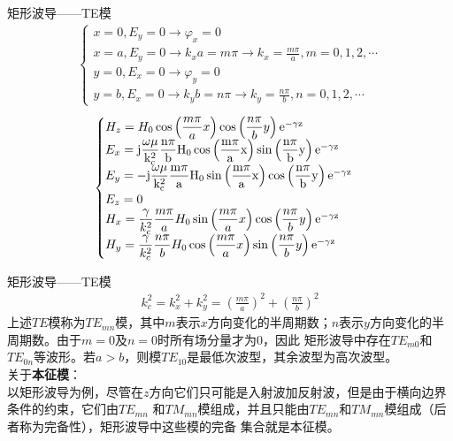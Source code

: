 \begin{frame}{矩形波导——TE模}
    \begin{align*}
        \begin{cases}
            x=0,E_y=0 \rightarrow \varphi_x=0                                              \\
            x=a,E_y=0 \rightarrow k_x a=m\pi \rightarrow k_x=\frac{m\pi}{a},m=0,1,2,\cdots \\
            y=0,E_x=0 \rightarrow \varphi_y=0                                              \\
            y=b,E_x=0 \rightarrow k_y b=n\pi \rightarrow k_y=\frac{n\pi}{b},n=0,1,2,\cdots
        \end{cases}
    \end{align*}
    \begin{align}
        \begin{cases}
            H_z=H_0\cos\left(\dfrac{m\pi}{a}x\right)\cos\left(\dfrac{n\pi}{b}y\right)\rm{e}^{-\gamma z}                                               \\
            E_x=\rm{j}\dfrac{\omega\mu}{k_c^2}\dfrac{n\pi}{b}H_0\cos\left(\dfrac{m\pi}{a}x\right)\sin\left(\dfrac{n\pi}{b}y\right)\rm{e}^{-\gamma z}  \\
            E_y=-\rm{j}\dfrac{\omega\mu}{k_c^2}\dfrac{m\pi}{a}H_0\sin\left(\dfrac{m\pi}{a}x\right)\cos\left(\dfrac{n\pi}{b}y\right)\rm{e}^{-\gamma z} \\
            E_z=0                                                                                                                                     \\
            H_x=\dfrac{\gamma}{k_c^2}\dfrac{m\pi}{a}H_0\sin\left(\dfrac{m\pi}{a}x\right)\cos\left(\dfrac{n\pi}{b}y\right)\rm{e}^{-\gamma z}           \\
            H_y=\dfrac{\gamma}{k_c^2}\dfrac{n\pi}{b}H_0\cos\left(\dfrac{m\pi}{a}x\right)\sin\left(\dfrac{n\pi}{b}y\right)\rm{e}^{-\gamma z}
        \end{cases}
    \end{align}

\end{frame}

\begin{frame}{矩形波导——TE模}
    \begin{align}
        k_c^2=k_x^2+k_y^2=\left(\frac{m\pi}{a}\right)^2+\left(\frac{n\pi}{b}\right)^2
    \end{align}
    上述$TE$模称为$TE_{mn}$模，其中$m$表示$x$方向变化的半周期数；$n$表示$y$方向变化的半周期数。由于$m=0$及$n=0$时所有场分量才为0，因此
    矩形波导中存在$TE_{m0}$和$TE_{0n}$等波形。若$a>b$，则模$TE_{10}$是最低次波型，其余波型为高次波型。\\
    关于\textbf{本征模}：\\
    以矩形波导为例，尽管在$z$方向它们只可能是入射波加反射波，但是由于横向边界条件的约束，它们由$TE_{mn}$
    和$TM_{mn}$模组成，并且只能由$TE_{mn}$和$TM_{mn}$模组成（后者称为完备性），矩形波导中这些模的完备
    集合就是本征模。
\end{frame}

